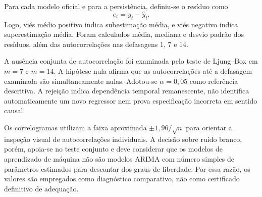Para cada modelo oficial e para a persistência, definiu-se o resíduo como
\begin{equation}
    e_t=y_t-\widehat y_t.
\end{equation}
Logo, viés médio positivo indica subestimação média, e viés negativo indica superestimação média. Foram calculados média, mediana e desvio padrão dos resíduos, além das autocorrelações nas defasagens 1, 7 e 14.

A ausência conjunta de autocorrelação foi examinada pelo teste de Ljung--Box \cite{ljung1978measure} em $m=7$ e $m=14$. A hipótese nula afirma que as autocorrelações até a defasagem examinada são simultaneamente nulas. Adotou-se $\alpha=0{,}05$ como referência descritiva. A rejeição indica dependência temporal remanescente, não identifica automaticamente um novo regressor nem prova especificação incorreta em sentido causal.

Os correlogramas utilizam a faixa aproximada $\pm1{,}96/\sqrt{n}$ para orientar a inspeção visual de autocorrelações individuais. A decisão sobre ruído branco, porém, apoia-se no teste conjunto e deve considerar que os modelos de aprendizado de máquina não são modelos ARIMA com número simples de parâmetros estimados para descontar dos graus de liberdade. Por essa razão, os valores são empregados como diagnóstico comparativo, não como certificado definitivo de adequação.
